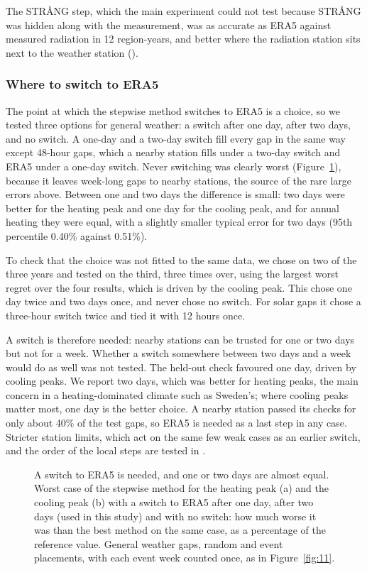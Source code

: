 The STRÅNG step, which the main experiment could not test because STRÅNG was hidden along with the measurement, was as accurate as ERA5 against measured radiation in 12 region-years, and better where the radiation station sits next to the weather station ().

\subsubsection*{Where to switch to ERA5}

The point at which the stepwise method switches to ERA5 is a choice, so we tested three options for general weather: a switch after one day, after two days, and no switch. A one-day and a two-day switch fill every gap in the same way except 48-hour gaps, which a nearby station fills under a two-day switch and ERA5 under a one-day switch. Never switching was clearly worst (Figure~\ref{fig:13}), because it leaves week-long gaps to nearby stations, the source of the rare large errors above. Between one and two days the difference is small: two days were better for the heating peak and one day for the cooling peak, and for annual heating they were equal, with a slightly smaller typical error for two days (95th percentile 0.40\% against 0.51\%).

To check that the choice was not fitted to the same data, we chose on two of the three years and tested on the third, three times over, using the largest worst regret over the four results, which is driven by the cooling peak. This chose one day twice and two days once, and never chose no switch. For solar gaps it chose a three-hour switch twice and tied it with 12 hours once.

A switch is therefore needed: nearby stations can be trusted for one or two days but not for a week. Whether a switch somewhere between two days and a week would do as well was not tested. The held-out check favoured one day, driven by cooling peaks. We report two days, which was better for heating peaks, the main concern in a heating-dominated climate such as Sweden's; where cooling peaks matter most, one day is the better choice. A nearby station passed its checks for only about 40\% of the test gaps, so ERA5 is needed as a last step in any case. Stricter station limits, which act on the same few weak cases as an earlier switch, and the order of the local steps are tested in .

\begin{figure}[tbp]
\centering
{}
\caption{A switch to ERA5 is needed, and one or two days are almost equal. Worst case of the stepwise method for the heating peak (a) and the cooling peak (b) with a switch to ERA5 after one day, after two days (used in this study) and with no switch: how much worse it was than the best method on the same case, as a percentage of the reference value. General weather gaps, random and event placements, with each event week counted once, as in Figure~\ref{fig:11}.}
\label{fig:13}
\end{figure}

